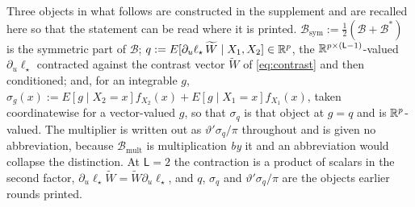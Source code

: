 Three objects in what follows are constructed in the supplement and are
recalled here so that the statement can be read where it is printed.
$\mathcal B_{\mathrm{sym}}:=\tfrac12(\mathcal B+\mathcal B^{\ast})$ is the
symmetric part of $\mathcal B$; $q:=E[\partial_u\ell_\star\,\widetilde W\mid
X_1,X_2]\in\mathbb{R}^{p}$, the $\mathbb{R}^{p\times(\mathsf L-1)}$-valued $\partial_u\ell_\star$
contracted against the contrast vector $\widetilde W$ of \eqref{eq:contrast} and then
conditioned; and, for an integrable $g$, $\sigma_g(x):=E[g\mid X_2=x]f_{X_2}(x)
+E[g\mid X_1=x]f_{X_1}(x)$, taken coordinatewise for a vector-valued $g$, so that
$\sigma_q$ is that object at $g=q$ and is $\mathbb{R}^{p}$-valued. The
multiplier is written out as $\vartheta'\sigma_q/\pi$ throughout and is given no
abbreviation, because $\mathcal B_{\mathrm{mult}}$ is multiplication \emph{by} it
and an abbreviation would collapse the distinction.
At $\mathsf L=2$ the contraction is a product of scalars in the second factor,
$\partial_u\ell_\star\widetilde W=\widetilde W\partial_u\ell_\star$, and $q$, $\sigma_q$ and
$\vartheta'\sigma_q/\pi$ are the objects earlier rounds printed.

